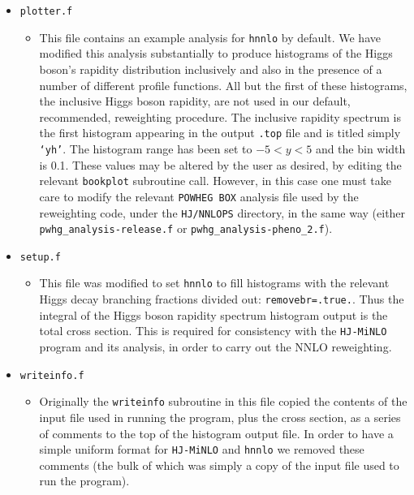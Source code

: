 \documentclass[11pt,a4paper]{article}
\newcommand{\noun}[1]{{\tt #1}}
\newcommand{\POWHEGBOX}{\noun{POWHEG BOX}}
\newcommand{\HJMINLO}{\noun{HJ-MiNLO}}
\newcommand{\HNNLO}{\noun{hnnlo}}
\begin{document}
\begin{itemize}
\item {\tt{plotter.f}}
  \begin{itemize}
  \item This file contains an example analysis for \HNNLO{} by
    default.  We have modified this analysis substantially to produce
    histograms of the Higgs boson's rapidity distribution inclusively
    and also in the presence of a number of different profile
    functions. All but the first of these histograms, the inclusive
    Higgs boson rapidity, are not used in our default, recommended,
    reweighting procedure. The inclusive rapidity spectrum is the
    first histogram appearing in the output {\tt{.top}} file and is
    titled simply {\tt{`yh'}}. The histogram range has been set to
    $-5<y<5$ and the bin width is 0.1. These values may be altered by
    the user as desired, by editing the relevant {\tt{bookplot}}
    subroutine call. However, in this case one must take care to
    modify the relevant \POWHEGBOX{} analysis file used by the
    reweighting code, under the {\tt{HJ/NNLOPS}} directory, in the
    same way (either {\tt{pwhg\_analysis-release.f}} or
    {\tt{pwhg\_analysis-pheno\_2.f}}).
  \end{itemize}

\item {\tt{setup.f}}
  \begin{itemize}
  \item This file was modified to set \HNNLO{} to fill histograms with the
    relevant Higgs decay branching fractions divided out:
    {\tt{removebr=.true.}}. Thus the integral of the Higgs boson rapidity
    spectrum histogram output is the total cross section. This is required
    for consistency with the \HJMINLO{} program and its analysis, in order
    to carry out the NNLO reweighting.
  \end{itemize}

\item {\tt{writeinfo.f}}
  \begin{itemize}
  \item Originally the {\tt{writeinfo}} subroutine in this file copied
    the contents of the input file used in running the program, plus the
    cross section, as a series of comments to the top of the histogram
    output file. In order to have a simple uniform format for \HJMINLO{}
    and \HNNLO{} we removed these comments (the bulk of which was simply
    a copy of the input file used to run the program).
  \end{itemize}

\end{itemize}
\end{document}
